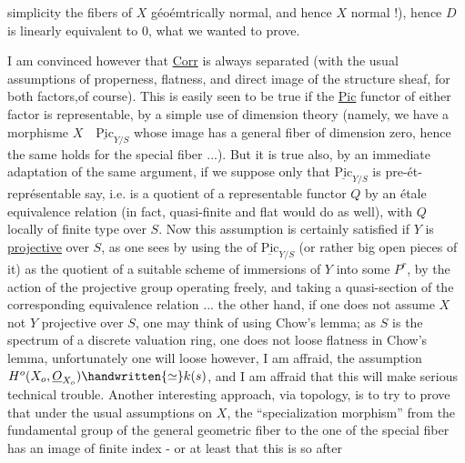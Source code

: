 simplicity the fibers of $X$ géoémtrically normal, and hence $X$ normal !), hence $D$ is linearly equivalent to $0$, what we wanted to prove.

I am convinced however that \uline{Corr} is always separated (with the usual assumptions of properness, flatness, and direct image of the structure sheaf, for both factors,of course). This is easily seen to be true if the \uline{Pic} functor of either factor is representable, by a simple use of dimension theory (namely, we have a morphisme $X\quad\underline{\mathrm{Pic}}_{Y/S}$ whose image has a general fiber of dimension zero, hence the same holds for the special fiber ...). But it is true also, by an immediate adaptation of the same argument, if we suppose only that $\underline{\mathrm{Pic}}_{Y/S}$ is pre-ét-représentable say, i.e. is a quotient of a representable functor $Q$ by an étale equivalence relation (in fact, quasi-finite and flat would do as well), with $Q$ locally of finite type over $S$. Now this assumption is certainly satisfied if $Y$ is \uline{projective} over $S$, as one sees by using the  of $\underline{\mathrm{Pic}}_{Y/S}$ (or rather big open pieces of it) as the quotient of a suitable scheme of immersions of $Y$ into some $P^{r}$, by the action of the projective group operating freely, and taking a quasi-section of the corresponding equivalence relation ...  the other hand, if one does not assume $X$ not $Y$ projective over $S$, one may think of using Chow's lemma; as $S$ is the spectrum of a discrete valuation ring, one does not loose flatness in  Chow's lemma, unfortunately one will loose however, I am affraid, the assumption $H^{o}(X_{o},\underline{O}_{X_{o}})\handwritten{\simeq}k(s)$, and I am affraid that this will make serious technical trouble. Another interesting approach, via topology, is to try to prove that under the usual assumptions on $X$, the ``specialization morphism'' from the fundamental group of the general geometric fiber to the one of the special fiber has an image of finite index - or at least that this is so after
